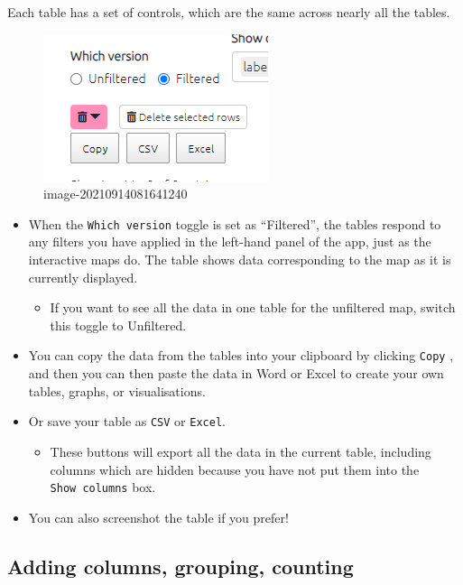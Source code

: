 \documentclass[
]{book}
\providecommand{\tightlist}{%
  \setlength{\itemsep}{0pt}\setlength{\parskip}{0pt}}
\begin{document}
Each table has a set of controls, which are the same across nearly all the tables.

\begin{figure}
\centering
\includegraphics{_assets/image-20210914081641240.png}
\caption{image-20210914081641240}
\end{figure}

\begin{itemize}
\tightlist
\item
  When the \texttt{Which\ version} toggle is set as ``Filtered'', the tables respond to any filters you have applied in the left-hand panel of the app, just as the interactive maps do. The table shows data corresponding to the map as it is currently displayed.

  \begin{itemize}
  \tightlist
  \item
    If you want to see all the data in one table for the unfiltered map, switch this toggle to Unfiltered.
  \end{itemize}
\item
  You can copy the data from the tables into your clipboard by clicking \texttt{Copy} , and then you can then paste the data in Word or Excel to create your own tables, graphs, or visualisations.
\item
  Or save your table as \texttt{CSV} or \texttt{Excel}.

  \begin{itemize}
  \tightlist
  \item
    These buttons will export all the data in the current table, including columns which are hidden because you have not put them into the \texttt{Show\ columns} box.
  \end{itemize}
\item
  You can also screenshot the table if you prefer!
\end{itemize}

\hypertarget{adding-columns-grouping-counting}{%
\subsection{Adding columns, grouping, counting}\label{adding-columns-grouping-counting}}
\end{document}
